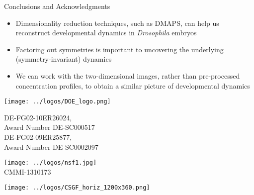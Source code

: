 \documentclass[10pt]{beamer}
\begin{document}
\begin{frame}{Conclusions and Acknowledgments}
    \begin{itemize}
        \item Dimensionality reduction techniques, such as DMAPS, can help  us reconstruct developmental dynamics in {\em Drosophila} embryos
        \item Factoring out symmetries is important to uncovering the underlying (symmetry-invariant) dynamics
        \item We can work with the two-dimensional images, rather than pre-processed concentration profiles, to obtain a similar picture of developmental dynamics
        
    \end{itemize}
    
     \vfill
    
    \centering
    \begin{minipage}{0.2\textwidth}
    	\centering
    	\texttt{[image: ../logos/DOE\_logo.png]}\\
		{\footnotesize DE-FG02-10ER26024, \\Award Number DE-SC000517 \\ DE-FG02-09ER25877, \\Award Number DE-SC0002097 \par}
    \end{minipage}
    \begin{minipage}{0.2\textwidth}
    	\centering
    	\texttt{[image: ../logos/nsf1.jpg]}\\
		{\footnotesize CMMI-1310173}
    \end{minipage}
    \begin{minipage}{0.2\textwidth}
	    \centering
    	\texttt{[image: ../logos/CSGF\_horiz\_1200x360.png]}
    \end{minipage}
    
\end{frame}
\end{document}
